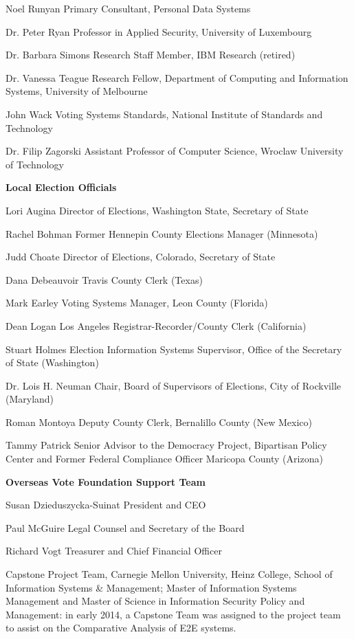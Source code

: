 Noel Runyan
Primary Consultant, Personal Data Systems
 
Dr. Peter Ryan
Professor in Applied Security, University of Luxembourg
 
Dr. Barbara Simons
Research Staff Member, IBM Research (retired)
 
Dr. Vanessa Teague
Research Fellow, Department of Computing and Information Systems, University of Melbourne
 
John Wack
Voting Systems Standards, National Institute of Standards and Technology
 
Dr. Filip Zagorski
Assistant Professor of Computer Science, Wroclaw University of Technology
 
\textbf{Local Election Officials}

Lori Augina
Director of Elections, Washington State, Secretary of State

Rachel Bohman
Former Hennepin County Elections Manager (Minnesota)

Judd Choate
Director of Elections, Colorado, Secretary of State

Dana Debeauvoir
Travis County Clerk (Texas)
 
Mark Earley
Voting Systems Manager, Leon County (Florida)
 
Dean Logan
Los Angeles Registrar-Recorder/County Clerk (California)

Stuart Holmes
Election Information Systems Supervisor, Office of the Secretary of State (Washington)
 
Dr. Lois H. Neuman
Chair, Board of Supervisors of Elections, City of Rockville (Maryland)
 
Roman Montoya
Deputy County Clerk, Bernalillo County (New Mexico)
 
Tammy Patrick
Senior Advisor to the Democracy Project, Bipartisan Policy Center and Former Federal Compliance Officer Maricopa County (Arizona)
 
\textbf{Overseas Vote Foundation Support Team}

Susan Dzieduszycka-Suinat
President and CEO
 
Paul McGuire
Legal Counsel and Secretary of the Board
 
Richard Vogt
Treasurer and Chief Financial Officer

Capstone Project Team, Carnegie Mellon University, Heinz College,
School of Information Systems \& Management; Master of Information
Systems Management and Master of Science in Information Security
Policy and Management: in early 2014, a Capstone Team was assigned to
the project team to assist on the Comparative Analysis of E2E systems.

